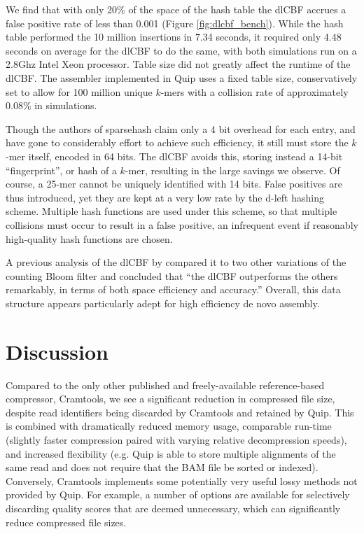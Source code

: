 \documentclass[a4,center,fleqn]{NAR}
\begin{document}
We find that with only 20\% of the space of the hash table the dlCBF accrues a
false positive rate of less than 0.001 (Figure \ref{fig:dlcbf_bench}). While
the hash table performed the 10 million insertions in 7.34 seconds, it
required only 4.48 seconds on average for the dlCBF to do the same, with both
simulations run on a 2.8Ghz Intel Xeon processor. Table size did not greatly
affect the runtime of the dlCBF. The assembler implemented in Quip uses a
fixed table size, conservatively set to allow for 100 million unique $k$-mers
with a collision rate of approximately 0.08\% in simulations.

Though the authors of sparsehash claim only a 4 bit overhead for each entry,
and have gone to considerably effort to achieve such efficiency, it still must
store the $k$-mer itself, encoded in 64 bits. The dlCBF avoids this, storing
instead a 14-bit ``fingerprint'', or hash of a $k$-mer, resulting in the large
savings we observe. Of course, a 25-mer cannot be uniquely identified with 14
bits. False positives are thus introduced, yet they are kept at a very low
rate by the d-left hashing scheme. Multiple hash functions are used
under this scheme, so that multiple collisions must occur to result in a false
positive, an infrequent event if reasonably high-quality hash functions are
chosen.

A previous analysis of the dlCBF by \citet{Zhang2009} compared it to two other
variations of the counting Bloom filter and concluded that ``the dlCBF
outperforms the others remarkably, in terms of both space efficiency and
accuracy.'' Overall, this data structure appears particularly adept for high
efficiency de novo assembly.

\section{Discussion}

Compared to the only other published and freely-available reference-based
compressor, Cramtools, we see a significant reduction in compressed file size,
despite read identifiers being discarded by Cramtools and retained by Quip.
This is combined with dramatically reduced memory usage, comparable run-time
(slightly faster compression paired with varying relative decompression
speeds), and increased flexibility (e.g. Quip is able to store multiple
alignments of the same read and does not require that the BAM file be sorted
or indexed). Conversely, Cramtools implements some potentially very useful
lossy methods not provided by Quip. For example, a number of options are
available for selectively discarding quality scores that are deemed
unnecessary, which can significantly reduce compressed file sizes.
\end{document}
